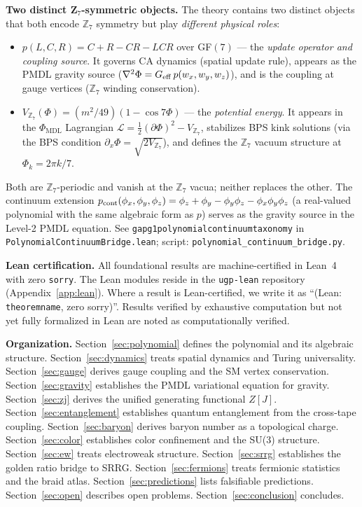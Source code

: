 \documentclass[11pt]{article}
\theoremstyle{remark}
\newcommand{\PHIMDL}{\Phi_{\mathrm{MDL}}}
\newcommand{\ZS}{\mathbb{Z}_7}
\newcommand{\lean}[1]{%
  \penalty-100
  \begingroup\def\_{\textunderscore\allowbreak}\texttt{#1}\endgroup}
\begin{document}
\medskip
\noindent\textbf{Two distinct Z$_7$-symmetric objects.}
The theory contains two distinct objects that both encode $\ZS$ symmetry but play
\emph{different physical roles}:
\begin{itemize}[noitemsep]
  \item $p(L,C,R) = C+R-CR-LCR$ over GF$(7)$ --- the \emph{update operator and coupling source}.
    It governs CA dynamics (spatial update rule), appears as the PMDL gravity source
    ($\nabla^2\Phi = G_{\rm eff}\,p(w_x,w_y,w_z)$), and is the coupling at gauge vertices
    ($\ZS$ winding conservation).
  \item $V_{\ZS}(\Phi) = (m^2/49)(1-\cos 7\Phi)$ --- the \emph{potential energy}.
    It appears in the $\PHIMDL$ Lagrangian $\mathcal{L} = \tfrac{1}{2}(\partial\Phi)^2 - V_{\ZS}$,
    stabilizes BPS kink solutions (via the BPS condition $\partial_x\Phi = \sqrt{2V_{\ZS}}$),
    and defines the $\ZS$ vacuum structure at $\Phi_k = 2\pi k/7$.
\end{itemize}
Both are $\ZS$-periodic and vanish at the $\ZS$ vacua; neither replaces the other.
The continuum extension $p_{\rm cont}(\phi_x,\phi_y,\phi_z) = \phi_z+\phi_y-\phi_y\phi_z-\phi_x\phi_y\phi_z$
(a real-valued polynomial with the same algebraic form as $p$) serves as the gravity source
in the Level-2 PMDL equation.  See \lean{gap\_g1\_polynomial\_continuum\_taxonomy}
in \lean{PolynomialContinuumBridge.lean}; script: \texttt{polynomial\_continuum\_bridge.py}.



\medskip
\noindent\textbf{Lean certification.}
All foundational results are machine-certified in Lean~4 with zero \texttt{sorry}.
The Lean modules reside in the \texttt{ugp-lean} repository (Appendix~\ref{app:lean}).
Where a result is Lean-certified, we write it as ``(Lean: \lean{theorem\_name}, zero sorry)''.
Results verified by exhaustive computation but not yet fully formalized in Lean
are noted as computationally verified.

\medskip
\noindent\textbf{Organization.}
Section~\ref{sec:polynomial} defines the polynomial and its algebraic structure.
Section~\ref{sec:dynamics} treats spatial dynamics and Turing universality.
Section~\ref{sec:gauge} derives gauge coupling and the SM vertex conservation.
Section~\ref{sec:gravity} establishes the PMDL variational equation for gravity.
Section~\ref{sec:zj} derives the unified generating functional $Z[J]$.
Section~\ref{sec:entanglement} establishes quantum entanglement from the cross-tape coupling.
Section~\ref{sec:baryon} derives baryon number as a topological charge.
Section~\ref{sec:color} establishes color confinement and the SU(3) structure.
Section~\ref{sec:ew} treats electroweak structure.
Section~\ref{sec:srrg} establishes the golden ratio bridge to SRRG.
Section~\ref{sec:fermions} treats fermionic statistics and the braid atlas.
Section~\ref{sec:predictions} lists falsifiable predictions.
Section~\ref{sec:open} describes open problems.
Section~\ref{sec:conclusion} concludes.
\end{document}
